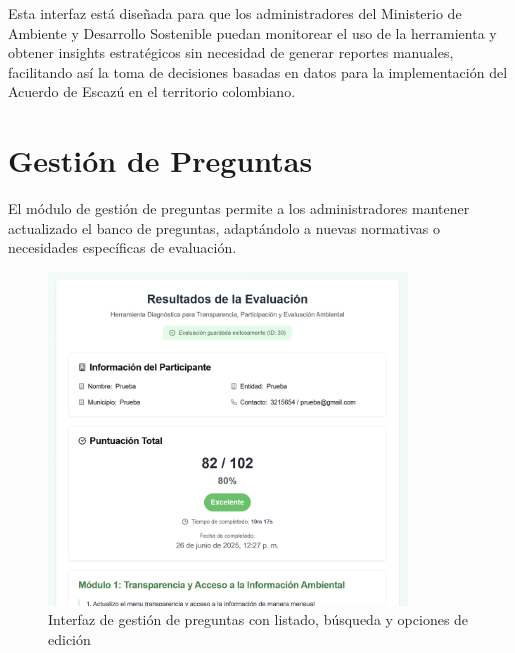 \documentclass[12pt,a4paper]{report}
\begin{document}
Esta interfaz está diseñada para que los administradores del Ministerio de Ambiente y Desarrollo Sostenible puedan monitorear el uso de la herramienta y obtener insights estratégicos sin necesidad de generar reportes manuales, facilitando así la toma de decisiones basadas en datos para la implementación del Acuerdo de Escazú en el territorio colombiano.

\section{Gestión de Preguntas}
El módulo de gestión de preguntas permite a los administradores mantener actualizado el banco de preguntas, adaptándolo a nuevas normativas o necesidades específicas de evaluación.

\begin{figure}[h]
    \centering
    \includegraphics[width=0.85\textwidth]{Captura de pantalla 2025-06-26 122733.png}
    \caption{Interfaz de gestión de preguntas con listado, búsqueda y opciones de edición}
\end{figure}
\end{document}
